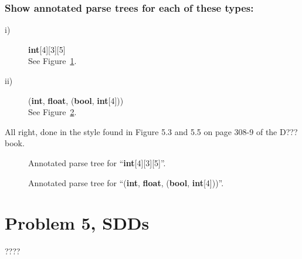 \subsubsection{Show annotated parse trees for each of these types:}
\begin{description}
	\item[i)] \textbf{int}[4][3][5] \\
		See Figure~\ref{fig:4-b-i}.
	\item[ii)] (\textbf{int}, \textbf{float}, (\textbf{bool}, \textbf{int}[4])) \\
		See Figure~\ref{fig:4-b-ii}.
\end{description}

All right, done in the style found in Figure 5.3 and 5.5 on page 308-9 of the \textsc{D???} book.
\begin{figure}[H]

\caption{Annotated parse tree for ``\textbf{int}[4][3][5]''.}
\label{fig:4-b-i}
\end{figure}


\begin{figure}[H]

\caption{Annotated parse tree for ``(\textbf{int}, \textbf{float}, (\textbf{bool}, \textbf{int}[4]))''.}
\label{fig:4-b-ii}
\end{figure}

\newpage
\section{Problem 5, SDDs}
????

